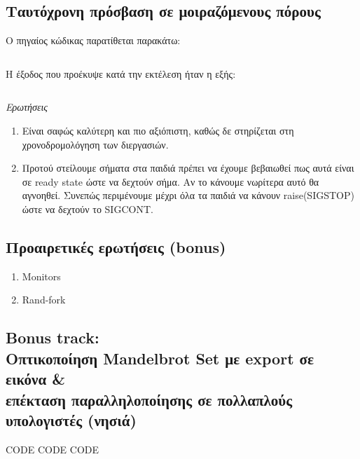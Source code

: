 \documentclass[a4paper,10pt]{article} \usepackage{anysize}
\begin{document}
\subsection{Ταυτόχρονη πρόσβαση σε μοιραζόμενους πόρους} 
Ο πηγαίος κώδικας παρατίθεται παρακάτω:
\inputminted[linenos,fontsize=\footnotesize,frame=leftline]{c}{files/ask2-signals.c}
\pagebreak

Η έξοδος που προέκυψε κατά την εκτέλεση ήταν η εξής:
\inputminted[linenos,fontsize=\footnotesize,frame=leftline]{bash}{files/ask2-signals.out}

\emph{Ερωτήσεις}
\begin{enumerate}
\item Είναι σαφώς καλύτερη και πιο αξιόπιστη, καθώς δε στηρίζεται στη
χρονοδρομολόγηση των διεργασιών.
\item Προτού στείλουμε σήματα στα παιδιά πρέπει να έχουμε βεβαιωθεί πως αυτά
είναι σε ready state ώστε να δεχτούν σήμα. Αν το κάνουμε νωρίτερα αυτό θα
αγνοηθεί. Συνεπώς περιμένουμε μέχρι όλα τα παιδιά να κάνουν raise(SIGSTOP)
ώστε να δεχτούν το SIGCONT.
\end{enumerate}

\subsection{Προαιρετικές ερωτήσεις (bonus)} 

\begin{enumerate}
\item Monitors

\item Rand-fork
\end{enumerate}

\subsection{Bonus track: \\Οπτικοποίηση Mandelbrot Set με export σε εικόνα \& \\επέκταση παραλληλοποίησης σε πολλαπλούς υπολογιστές (νησιά)}
CODE CODE CODE
\end{document}
